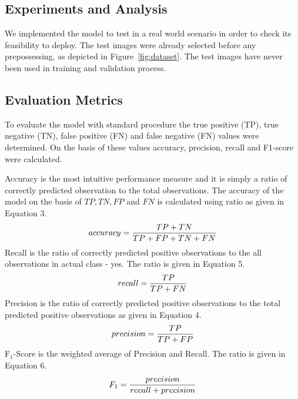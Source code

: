 \documentclass{bioinfo}
\begin{document}
\begin{methods}
\section{Experiments and Analysis}
We implemented the model to test in a real world scenario in order to check its feasibility to deploy. The test images were already selected before any prepossessing, as depicted in Figure~\ref{fig:dataset}. The test images have never been used in training and validation process.

\subsection{Evaluation Metrics}
To evaluate the model with standard procedure the true positive (TP), true negative (TN), false positive (FN) and false negative (FN) values were determined. On the basis of these values accuracy, precision, recall and F1-score \citep{kskur17} were calculated.


Accuracy is the most intuitive performance measure and it is simply a ratio of correctly predicted observation to the total observations. The accuracy of the model on the basis of $TP, TN, FP$ and $FN$ is calculated using ratio as given in Equation 3.
\begin{equation}
accuracy = \frac{TP+TN}{TP+FP+TN+FN}\label{eq:03}\vspace*{-10pt}
\end{equation}
Recall is the ratio of correctly predicted positive observations to the all observations in actual class - yes. The ratio is given in Equation 5.
\begin{equation}
recall= \frac{TP}{TP+FN}\label{eq:05}\vspace*{-10pt}
\end{equation}
Precision is the ratio of correctly predicted positive observations to the total predicted positive observations as given in Equation 4.
\begin{equation}
precision = \frac{TP}{TP+FP}\label{eq:04}\vspace*{-10pt}
\end{equation}
 F$_1$-Score is the weighted average of Precision and Recall. The ratio is given in Equation 6.
\begin{equation}
F_1= \frac{precision}{recall+precision}\label{eq:06}\vspace*{-10pt}
\end{equation}




\end{methods}
\end{document}
